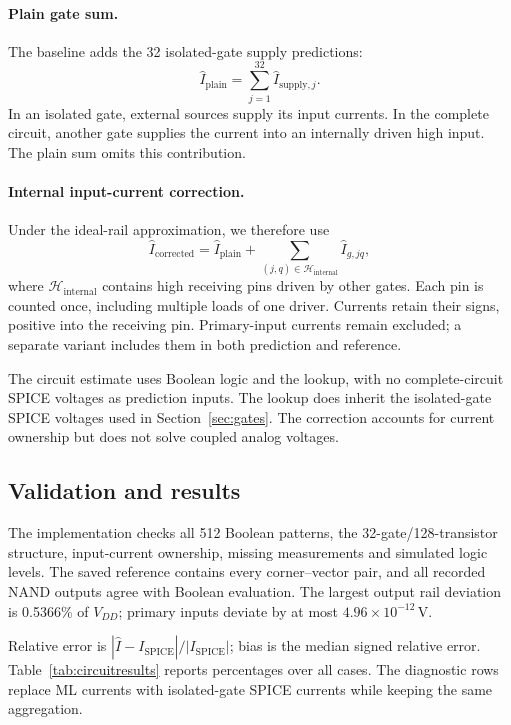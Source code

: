 \documentclass[11pt]{article}
\begin{document}
\paragraph{Plain gate sum.}
The baseline adds the 32 isolated-gate supply predictions:
\begin{equation}
\widehat I_{\mathrm{plain}}=\sum_{j=1}^{32}\widehat I_{\mathrm{supply},j}.
\end{equation}
In an isolated gate, external sources supply its input currents. In the
complete circuit, another gate supplies the current into an internally
driven high input. The plain sum omits this contribution.

\paragraph{Internal input-current correction.}
Under the ideal-rail approximation, we therefore use
\begin{equation}
\widehat I_{\mathrm{corrected}}=\widehat I_{\mathrm{plain}}+
\sum_{(j,q)\in\mathcal H_{\mathrm{internal}}}\widehat I_{g,jq},
\end{equation}
where $\mathcal H_{\mathrm{internal}}$ contains high receiving pins driven
by other gates. Each pin is counted once, including multiple loads of one
driver. Currents retain their signs, positive into the receiving pin.
Primary-input currents remain excluded; a separate variant includes them
in both prediction and reference.

The circuit estimate uses Boolean logic and the lookup, with no
complete-circuit SPICE voltages as prediction inputs. The lookup does
inherit the isolated-gate SPICE voltages used in Section~\ref{sec:gates}.
The correction accounts for current ownership but does not solve coupled
analog voltages.

\subsection{Validation and results}
The implementation checks all 512 Boolean patterns, the 32-gate/128-transistor
structure, input-current ownership, missing measurements and simulated logic
levels. The saved reference contains every corner--vector pair, and all
recorded NAND outputs agree with Boolean evaluation. The largest output
rail deviation is 0.5366\% of $V_{DD}$; primary inputs deviate by at most
$4.96\times10^{-12}$\,V.

Relative error is $|\widehat I-I_{\mathrm{SPICE}}|/|I_{\mathrm{SPICE}}|$;
bias is the median signed relative error. Table~\ref{tab:circuitresults}
reports percentages over all cases. The diagnostic rows replace ML currents
with isolated-gate SPICE currents while keeping the same aggregation.
\end{document}
